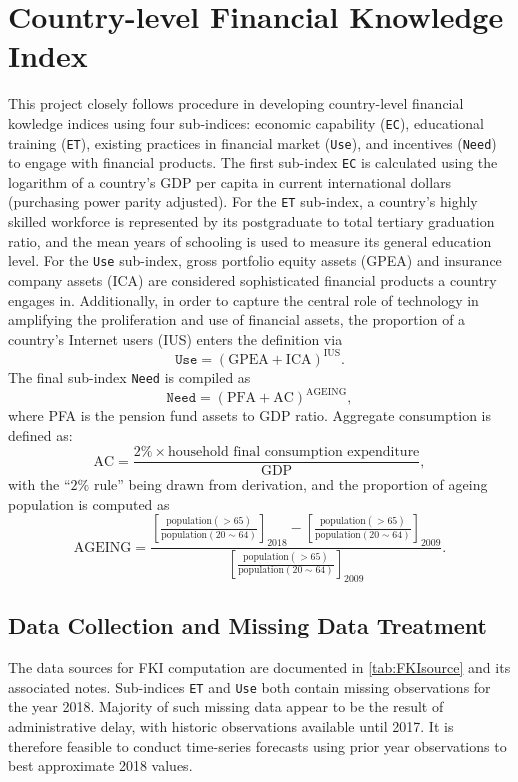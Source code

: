 \documentclass[a4paper,11pt,UKenglish,twoside,openright]{report}\usepackage[]{graphicx}\usepackage[]{color}
\begin{document}
\newpage

\section{Country-level Financial Knowledge Index}

This project closely follows  procedure in developing country-level financial kowledge indices using four sub-indices: economic capability (\texttt{EC}), educational training (\texttt{ET}), existing practices in financial market (\texttt{Use}), and incentives (\texttt{Need}) to engage with financial products. The first sub-index \texttt{EC} is calculated using the logarithm of a country's GDP per capita in current international dollars (purchasing power parity adjusted). For the \texttt{ET} sub-index, a country's highly skilled workforce is represented by its postgraduate to total tertiary graduation ratio, and the mean years of schooling is used to measure its general education level. For the \texttt{Use} sub-index, gross portfolio equity assets (GPEA) and insurance company assets (ICA) are considered sophisticated financial products a country engages in. Additionally, in order to capture the central role of technology in amplifying the proliferation and use of financial assets, the proportion of a country's Internet users (\textsc{IUS}) enters the definition via
\[ \texttt{Use} = ( \text{GPEA} + \text{ICA} ) ^ \text{IUS}. \]
The final sub-index \texttt{Need} is compiled as
\[ \texttt{Need} = ( \text{PFA} + \text{AC} ) ^ \text{AGEING}, \]
where \textsc{PFA} is the pension fund assets to GDP ratio. Aggregate consumption is defined as:
\[ \text{AC} = \frac{2\% \times \text{household final consumption expenditure}}{\text{GDP}}, \]
with the ``$2\%$ rule'' being drawn from  derivation, and the proportion of ageing population is computed as
\[ \text{AGEING} = \frac{ \left[ \frac{\text{population}(>65)}{\text{population}(20 \sim 64)} \right]_{2018} - \left[ \frac{\text{population}(>65)}{\text{population}(20 \sim 64)} \right]_{2009} }{ \left[ \frac{\text{population}(>65)}{\text{population}(20 \sim 64)} \right]_{2009} }. \]

\subsection{Data Collection and Missing Data Treatment}

The data sources for FKI computation are documented in \cref{tab:FKIsource} and its associated notes. Sub-indices \texttt{ET} and \texttt{Use} both contain missing observations for the year 2018. Majority of such missing data appear to be the result of administrative delay, with historic observations available until 2017. It is therefore feasible to conduct time-series forecasts using prior year observations to best approximate 2018 values.
\end{document}
